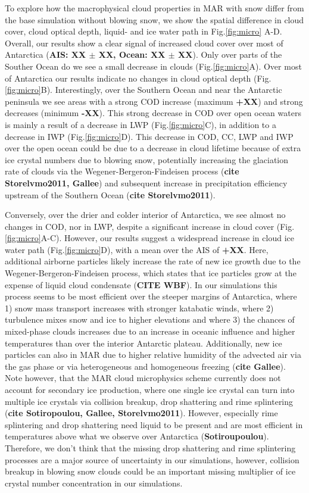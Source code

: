 \documentclass[12pt]{article}
\begin{document}
To explore how the macrophysical cloud properties in MAR with snow differ from the base simulation without blowing snow, we show the spatial difference in cloud cover, cloud optical depth, liquid- and ice water path in Fig.\ref{fig:micro} A-D. Overall, our results show a clear signal of increased cloud cover over most of Antarctica (\textbf{AIS: XX $\pm$ XX, Ocean: XX $\pm$ XX}). Only over parts of the Souther Ocean do we see a small decrease in clouds (Fig.\ref{fig:micro}A). Over most of Antarctica our results indicate no changes in cloud optical depth (Fig.\ref{fig:micro}B). Interestingly, over the Southern Ocean and near the Antarctic peninsula we see areas with a strong COD increase (maximum \textbf{+XX}) and strong decreases (minimum \textbf{-XX}). This strong decrease in COD over open ocean waters is mainly a result of a decrease in LWP (Fig.\ref{fig:micro}C), in addition to a decrease in IWP (Fig.\ref{fig:micro}D). This decrease in COD, CC, LWP and IWP over the open ocean could be due to a decrease in cloud lifetime because of extra ice crystal numbers due to blowing snow, potentially increasing the glaciation rate of clouds via the Wegener-Bergeron-Findeisen process (\textbf{cite Storelvmo2011, Gallee}) and subsequent increase in precipitation efficiency upstream of the Southern Ocean (\textbf{cite Storelvmo2011}).

Conversely, over the drier and colder interior of Antarctica, we see almost no changes in COD, nor in LWP, despite a significant increase in cloud cover (Fig.\ref{fig:micro}A-C). However, our results suggest a widespread increase in cloud ice water path (Fig.\ref{fig:micro}D), with a mean over the AIS of \textbf{+XX}. Here, additional airborne particles likely increase the rate of new ice growth due to the Wegener-Bergeron-Findeisen process, which states that ice particles grow at the expense of liquid cloud condensate (\textbf{CITE WBF}). In our simulations this process seems to be most efficient over the steeper margins of Antarctica, where 1) snow mass transport increases with stronger katabatic winds, where 2) turbulence mixes snow and ice to higher elevations and where 3) the chances of mixed-phase clouds increases due to an increase in oceanic influence and higher temperatures than over the interior Antarctic plateau. Additionally, new ice particles can also in MAR due to higher relative humidity of the advected air via the gas phase or via heterogeneous and homogeneous freezing (\textbf{cite Gallee}). Note however, that the MAR cloud microphysics scheme currently does not account for secondary ice production, where one single ice crystal can turn into multiple ice crystals via collision breakup, drop shattering and rime splintering (\textbf{cite Sotiropoulou, Gallee, Storelvmo2011}). However, especially rime splintering and drop shattering need liquid to be present and are most efficient in temperatures above what we observe over Antarctica (\textbf{Sotiroupoulou}). Therefore, we don't think that the missing drop shattering and rime splintering processes are a major source of uncertainty in our simulations, however, collision breakup in blowing snow clouds could be an important missing multiplier of ice crystal number concentration in our simulations.
\end{document}

